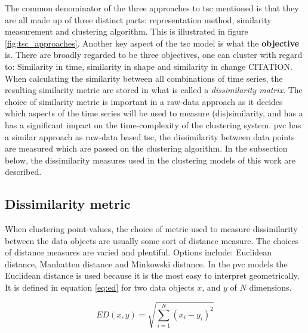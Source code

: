 The common denominator of the three approaches to \acrshort{tsc} mentioned is that they are all made up of three distinct parts: representation method, similarity measurement and clustering algorithm. This is illustrated in figure \ref{fig:tsc_approaches}. Another key aspect of the \acrshort{tsc} model is what the \textbf{objective} is. There are broadly regarded to be three objectives, one can cluster with regard to: Similarity in time, similarity in shape and similarity in change CITATION. When calculating the similarity between all combinations of time series, the resulting similarity metric are stored in what is called a \textit{dissimilarity matrix}. The choice of similarity metric is important in a raw-data approach as it decides which aspects of the time series will be used to measure (dis)similarity, and has a has a significant impact on the time-complexity of the clustering system. \acrshort{pvc} has a similar approach as raw-data based \acrshort{tsc}, the dissimilarity between data points are measured which are passed on the clustering algorithm. In the subsection below, the dissimilarity measures used in the clustering models of this work are described.

\subsection{Dissimilarity metric} \label{sec:theory_diss}
When clustering point-values, the choice of metric used to measure dissimilarity between the data objects are usually some sort of distance measure. The choices of distance measures are varied and plentiful. Options include: Euclidean distance, Manhatten distance and Minkowski distance. In the \acrshort{pvc} models the Euclidean distance is used because it is the most easy to interpret geometrically. It is defined in equation \eqref{eq:ed} for two data objects $x$, and $y$ of $N$ dimensions.

\begin{equation}
    ED(x,y) = \sqrt{\sum_{i = 1}^N (x_i - y_i)^2}
    \label{eq:ed}
\end{equation}

